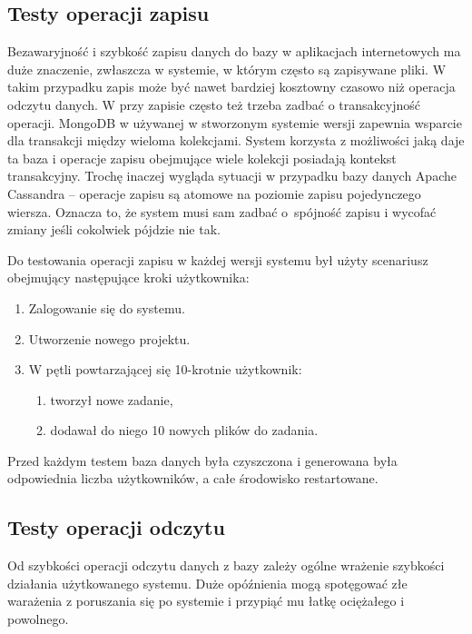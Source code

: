 \subsection{Testy operacji zapisu} \label{sec:zapisScenariusz}

Bezawaryjność i szybkość zapisu danych do bazy w aplikacjach internetowych ma duże znaczenie, zwłaszcza w systemie, w którym często są zapisywane pliki.
W takim przypadku zapis może być nawet bardziej kosztowny czasowo niż operacja odczytu danych.
W przy zapisie często też trzeba zadbać o transakcyjność operacji.
MongoDB w używanej w stworzonym systemie wersji zapewnia wsparcie dla transakcji między wieloma kolekcjami.
System korzysta z możliwości jaką daje ta baza i operacje zapisu obejmujące wiele kolekcji posiadają kontekst transakcyjny.
Trochę inaczej wygląda sytuacji w przypadku bazy danych Apache Cassandra -- operacje zapisu są atomowe na poziomie zapisu pojedynczego wiersza.
Oznacza to, że system musi sam zadbać o~spójność zapisu i wycofać zmiany jeśli cokolwiek pójdzie nie tak.

Do testowania operacji zapisu w każdej wersji systemu był użyty scenariusz obejmujący następujące kroki użytkownika:
\begin{enumerate}
    \item Zalogowanie się do systemu.
    \item Utworzenie nowego projektu.
    \item W pętli powtarzającej się 10-krotnie użytkownik:
    \begin{enumerate}
        \item tworzył nowe zadanie,
        \item dodawał do niego 10 nowych plików do zadania.
    \end{enumerate}
\end{enumerate}
Przed każdym testem baza danych była czyszczona i generowana była odpowiednia liczba użytkowników, a całe środowisko restartowane.

\subsection{Testy operacji odczytu} \label{sec:readTestScenario}

Od szybkości operacji odczytu danych z bazy zależy ogólne wrażenie szybkości działania użytkowanego systemu.
Duże opóźnienia mogą spotęgować złe warażenia z poruszania się po systemie i przypiąć mu łatkę ociężałego i powolnego.

